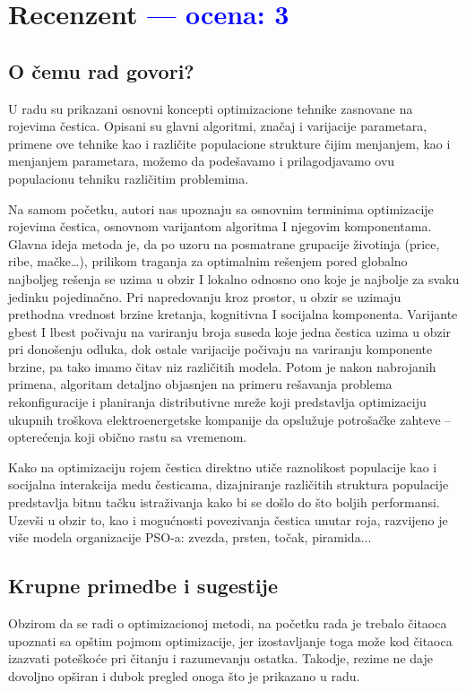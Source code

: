 \documentclass[a4paper]{report}
\newcommand{\odgovor}[1]{\textcolor{blue}{#1}}
\begin{document}
\chapter{Recenzent \odgovor{--- ocena: 3} }


\section{O čemu rad govori?}
{
U radu su prikazani osnovni koncepti optimizacione tehnike zasnovane na rojevima čestica. Opisani su glavni algoritmi, značaj i varijacije parametara, primene ove tehnike kao i različite populacione strukture čijim menjanjem, kao i menjanjem parametara, možemo da podešavamo i prilagodjavamo ovu populacionu tehniku različitim problemima.

Na samom početku, autori nas upoznaju sa osnovnim terminima optimizacije rojevima čestica, osnovnom varijantom algoritma I njegovim komponentama. Glavna ideja metoda je, da po uzoru na posmatrane grupacije životinja (price, ribe, mačke…), prilikom traganja za optimalnim rešenjem pored globalno najboljeg rešenja se uzima u obzir I lokalno odnosno ono koje je najbolje za svaku jedinku pojedinačno. Pri napredovanju kroz prostor, u obzir se uzimaju prethodna vrednost brzine kretanja, kognitivna I socijalna komponenta. Varijante gbest I lbest počivaju na variranju broja suseda koje jedna čestica uzima u obzir pri donošenju odluka, dok ostale varijacije počivaju na variranju komponente brzine, pa tako imamo čitav niz različitih modela.  Potom je nakon nabrojanih primena, algoritam detaljno objasnjen na primeru rešavanja problema rekonfiguracije i planiranja distributivne mreže  koji predstavlja optimizaciju ukupnih troškova elektroenergetske kompanije da opslužuje potrošačke zahteve – opterećenja koji obično rastu sa vremenom.

Kako na optimizaciju rojem čestica direktno utiče raznolikost populacije kao i socijalna interakcija medu česticama, dizajniranje različitih struktura populacije
predstavlja bitnu tačku istraživanja kako bi se došlo do što boljih performansi. Uzevši u obzir to, kao i mogućnosti povezivanja čestica unutar roja, razvijeno je više modela organizacije PSO-a: zvezda, prsten, točak, piramida... 
}

\section{Krupne primedbe i sugestije}
{ Obzirom da se radi o optimizacionoj metodi, na početku rada je trebalo čitaoca upoznati sa opštim pojmom optimizacije, jer izostavljanje toga može kod čitaoca izazvati poteškoće pri čitanju i razumevanju ostatka.}
{Takodje, rezime ne daje dovoljno opširan i dubok pregled onoga što je prikazano u radu. }
\end{document}
